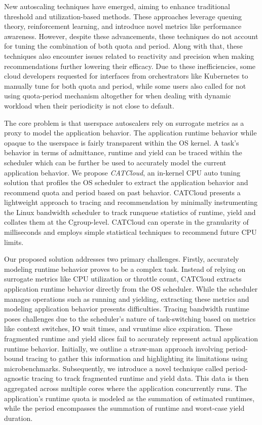 New autoscaling techniques have emerged, aiming to enhance traditional threshold and utilization-based methods. These approaches leverage queuing theory, reinforcement learning, and introduce novel metrics like performance awareness. However, despite these advancements, these techniques do not account for tuning the combination of both quota and period. Along with that, these techniques also encounter issues related to reactivity and precision when making recommendations further lowering their efficacy. Due to these inefficiencies, some cloud developers requested for interfaces \cite{noauthor_fix_nodate} from orchestrators like Kubernetes to manually tune for both quota and period, while some users also called for not using quota-period mechanism altogether \cite{noauthor_avoid_nodate} \cite{noauthor_requests_2023} \cite{noauthor_for_nodate} for when dealing with dynamic workload when their periodicity is not close to default.

The core problem is that userspace autoscalers rely on surrogate metrics as a proxy to model the application behavior. The application runtime behavior while opaque to the userspace is fairly transparent within the OS kernel. A task's behavior in terms of admittance, runtime and yield can be traced within the scheduler which can be further be used to accurately model the current application behavior. We propose \textit{CATCloud}, an in-kernel CPU auto tuning solution that profiles the OS scheduler to extract the application behavior and recommend quota and period based on past behavior. CATCloud presents a lightweight approach to tracing and recommendation by minimally instrumenting the Linux bandwidth scheduler to track runqueue statistics of runtime, yield and collates them at the Cgroup-level. CATCloud can operate in the granularity of milliseconds and employs simple statistical techniques to recommend future CPU limits.

Our proposed solution addresses two primary challenges. Firstly, accurately modeling runtime behavior proves to be a complex task. Instead of relying on surrogate metrics like CPU utilization or throttle count, CATCloud extracts application runtime behavior directly from the OS scheduler. While the scheduler manages operations such as running and yielding, extracting these metrics and modeling application behavior presents difficulties. Tracing bandwidth runtime poses challenges due to the scheduler's nature of task-switching based on metrics like context switches, IO wait times, and vruntime slice expiration. These fragmented runtime and yield slices fail to accurately represent actual application runtime behavior. Initially, we outline a straw-man approach involving period-bound tracing to gather this information and highlighting its limitations using microbenchmarks. Subsequently, we introduce a novel technique called period-agnostic tracing to track fragmented runtime and yield data. This data is then aggregated across multiple cores where the application concurrently runs. The application's runtime quota is modeled as the summation of estimated runtimes, while the period encompasses the summation of runtime and worst-case yield duration.

